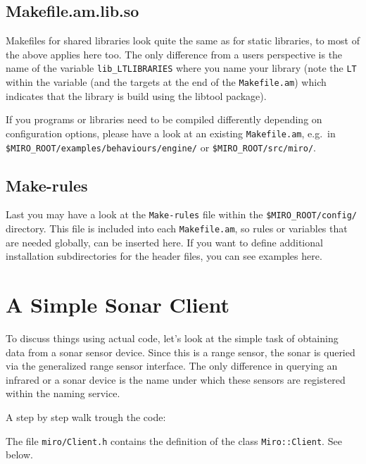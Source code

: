 \subsection{Makefile.am.lib.so}
Makefiles for shared libraries look quite the same as for static
libraries, to most of the above applies here too. The only difference
from a users perspective is the name of the variable
\texttt{lib\_LTLIBRARIES} where you name your library (note the
\texttt{LT} within the variable (and the targets at the end of the
\texttt{Makefile.am}) which indicates that the library is build using
the libtool package).

If you programs or libraries need to be compiled differently depending
on configuration options, please have a look at an existing
\texttt{Makefile.am}, e.g.\ in
\texttt{\$MIRO\_ROOT/\-examples/\-behaviours/\-engine/} or
\texttt{\$MIRO\_ROOT/\-src/\-miro/}.

\subsection{Make-rules}
Last you may have a look at the \texttt{Make-rules} file within the
\texttt{\$MIRO\_ROOT/config/} directory. This file is included into each
\texttt{Makefile.am}, so rules or variables that are needed globally,
can be inserted here. If you want to define additional installation
subdirectories for the header files, you can see examples here.


\section{A Simple Sonar Client}

To discuss things using actual code, let's look at the simple task of
obtaining data from a sonar sensor device. Since this is a range
sensor, the sonar is queried via the generalized range sensor
interface. The only difference in querying an infrared or a sonar
device is the name under which these sensors are registered within the
naming service.


\label{lst:SonarPoll1}

A step by step walk trough the code:



The file \lstinline!miro/Client.h! contains the definition of the class
\lstinline!Miro::Client!. See below.

